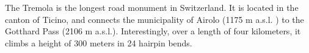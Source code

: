 The Tremola is the longest road monument in Switzerland.
It is located in the canton of Ticino, and connects the municipality of Airolo (1175 m a.s.l.
) to the Gotthard Pass (2106 m a.s.l.).
Interestingly, over a length of four kilometers, it climbs a height of 300 meters in 24 hairpin bends.
